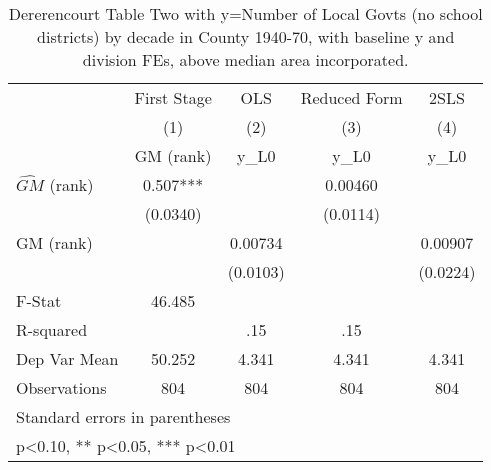 \begin{table}[htbp]\centering
\def\sym#1{\ifmmode^{#1}\else\(^{#1}\)\fi}
\caption{Dererencourt Table Two with y=Number of Local Govts (no school districts) by decade in County 1940-70, with baseline y and division FEs, above median area incorporated.}
\begin{tabular}{l*{4}{c}}
\toprule
                    & First Stage   &         OLS   &Reduced Form   &        2SLS   \\
                    &\multicolumn{1}{c}{(1)}&\multicolumn{1}{c}{(2)}&\multicolumn{1}{c}{(3)}&\multicolumn{1}{c}{(4)}\\
                    &\multicolumn{1}{c}{GM  (rank)}&\multicolumn{1}{c}{y\_L0}&\multicolumn{1}{c}{y\_L0}&\multicolumn{1}{c}{y\_L0}\\
\midrule
$\hat{GM}$ (rank)   &       0.507***&               &     0.00460   &               \\
                    &    (0.0340)   &               &    (0.0114)   &               \\
\addlinespace
GM  (rank)          &               &     0.00734   &               &     0.00907   \\
                    &               &    (0.0103)   &               &    (0.0224)   \\
\midrule
F-Stat              &      46.485   &               &               &               \\
R-squared           &               &         .15   &         .15   &               \\
Dep Var Mean        &      50.252   &       4.341   &       4.341   &       4.341   \\
Observations        &         804   &         804   &         804   &         804   \\
\bottomrule
\multicolumn{5}{l}{\footnotesize Standard errors in parentheses}\\
\multicolumn{5}{l}{\footnotesize * p<0.10, ** p<0.05, *** p<0.01}\\
\end{tabular}
\end{table}
